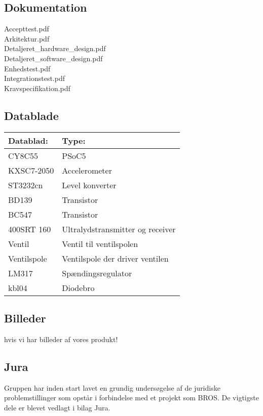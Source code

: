 \subsection{Dokumentation}
Accepttest.pdf\\
Arkitektur.pdf\\
Detaljeret\_hardware\_design.pdf\\
Detaljeret\_software\_design.pdf\\
Enhedstest.pdf\\
Integrationstest.pdf\\
Kravspecifikation.pdf\\

\subsection{Datablade}
\begin{table}[H]
\begin{tabular}{|l|l|}
\hline
\textbf{Datablad:}& \textbf{Type:} \\\hline
CY8C55 & PSoC5 \\\hline
KXSC7-2050& Accelerometer\\\hline
ST3232cn & Level konverter \\\hline
BD139 & Transistor \\\hline
BC547 & Transistor \\\hline
400SRT 160 & Ultralydstransmitter og receiver \\\hline
Ventil & Ventil til ventilspolen \\\hline
Ventilspole & Ventilspole der driver ventilen \\\hline
LM317 & Spændingsregulator \\\hline
kbl04 & Diodebro \\\hline

\end{tabular}
\end{table}


\subsection{Billeder}
hvis vi har billeder af vores produkt!\\

\subsection{Jura}
Gruppen har inden start lavet en grundig undersøgelse af de juridiske problemstillinger som opstår i forbindelse med et projekt som BROS. De vigtigste dele er blevet vedlagt i bilag Jura.